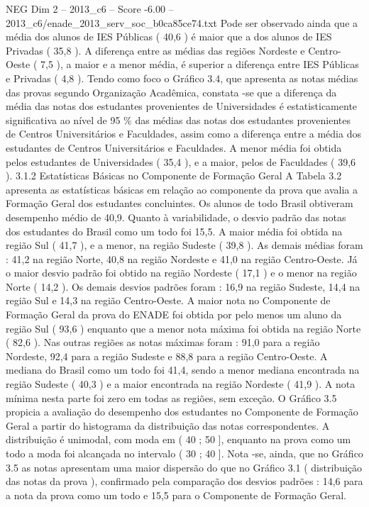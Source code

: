 \begin{textsample}{NEG Dim 2 – 2013\_c6 – Score -6.00 – 2013\_c6/enade\_2013\_serv\_soc\_b0ca85ce74.txt}
Pode ser observado ainda que a média dos alunos de IES Públicas ( 40,6 ) é maior que a dos alunos de IES Privadas ( 35,8 ).
A diferença entre as médias das regiões Nordeste e Centro-Oeste ( 7,5 ), a maior e a menor média, é superior a diferença entre IES Públicas e Privadas ( 4,8 ).
Tendo como foco o Gráfico 3.4, que apresenta as notas médias das provas segundo Organização Acadêmica, constata -se que a diferença da média das notas dos estudantes provenientes de Universidades é estatisticamente significativa ao nível de 95 \% das médias das notas dos estudantes provenientes de Centros Universitários e Faculdades, assim como a diferença entre a média dos estudantes de Centros Universitários e Faculdades.
A menor média foi obtida pelos estudantes de Universidades ( 35,4 ), e a maior, pelos de Faculdades ( 39,6 ). 3.1.2 Estatísticas Básicas no Componente de Formação Geral A Tabela 3.2 apresenta as estatísticas básicas em relação ao componente da prova que avalia a Formação Geral dos estudantes concluintes.
Os alunos de todo Brasil obtiveram desempenho médio de 40,9.
Quanto à variabilidade, o desvio padrão das notas dos estudantes do Brasil como um todo foi 15,5.
A maior média foi obtida na região Sul ( 41,7 ), e a menor, na região Sudeste ( 39,8 ).
As demais médias foram : 41,2 na região Norte, 40,8 na região Nordeste e 41,0 na região Centro-Oeste.
Já o maior desvio padrão foi obtido na região Nordeste ( 17,1 ) e o menor na região Norte ( 14,2 ).
Os demais desvios padrões foram : 16,9 na região Sudeste, 14,4 na região Sul e 14,3 na região Centro-Oeste.
A maior nota no Componente de Formação Geral da prova do ENADE foi obtida por pelo menos um aluno da região Sul ( 93,6 ) enquanto que a menor nota máxima foi obtida na região Norte ( 82,6 ).
Nas outras regiões as notas máximas foram : 91,0 para a região Nordeste, 92,4 para a região Sudeste e 88,8 para a região Centro-Oeste.
A mediana do Brasil como um todo foi 41,4, sendo a menor mediana encontrada na região Sudeste ( 40,3 ) e a maior encontrada na região Nordeste ( 41,9 ).
A nota mínima nesta parte foi zero em todas as regiões, sem exceção.
O Gráfico 3.5 propicia a avaliação do desempenho dos estudantes no Componente de Formação Geral a partir do histograma da distribuição das notas correspondentes.
A distribuição é unimodal, com moda em ( 40 ; 50 ], enquanto na prova como um todo a moda foi alcançada no intervalo ( 30 ; 40 ].
Nota -se, ainda, que no Gráfico 3.5 as notas apresentam uma maior dispersão do que no Gráfico 3.1 ( distribuição das notas da prova ), confirmado pela comparação dos desvios padrões : 14,6 para a nota da prova como um todo e 15,5 para o Componente de Formação Geral.

\end{textsample}
